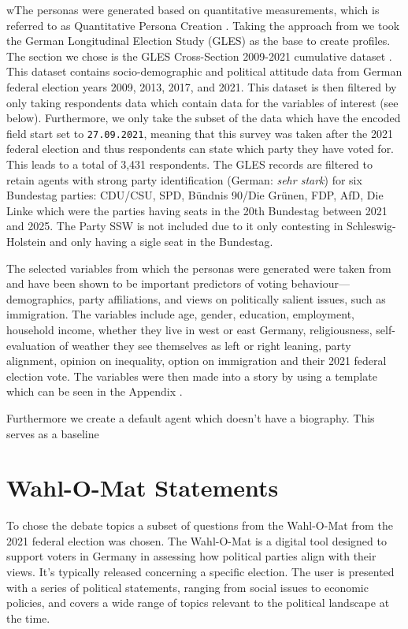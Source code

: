 wThe personas were generated based on quantitative measurements, which is referred to as Quantitative Persona Creation \cite{Salminen2020quantative}. Taking the approach from \cite{von2024vox} we took the German Longitudinal Election Study (GLES) as the base to create profiles. The section we chose is the GLES Cross-Section 2009-2021 cumulative dataset \citep{ZA6835}. This dataset contains socio-demographic and political attitude data from German federal election years 2009, 2013, 2017, and 2021. This dataset  is then filtered by only taking respondents data which contain data for the variables of interest (see below). Furthermore, we only take the subset of the data which have the encoded field start set to \texttt{27.09.2021}, meaning that this survey was taken after the 2021 federal election and thus respondents can state which party they have voted for. This leads to a total of 3,431 respondents. The GLES records are filtered to retain agents with strong party identification (German: \emph{sehr stark}) for six Bundestag parties: CDU/CSU, SPD, Bündnis 90/Die Grünen, FDP, AfD, Die Linke which were the parties having seats in the 20th Bundestag between 2021 and 2025. The Party SSW is not included due to it only contesting in Schleswig-Holstein and only having a sigle seat in the Bundestag. 

The selected variables from which the personas were generated were taken from \cite{von2024vox} and have been shown to be important predictors of voting behaviour—demographics, party affiliations, and views on politically salient issues, such as immigration. The variables include age, gender, education, employment, household income, whether they live in west or east Germany, religiousness, self-evaluation of weather they see themselves as left or right leaning, party alignment, opinion on inequality, option on immigration and their 2021 federal election vote. The variables were then made into a story by using a template which can be seen in the Appendix .

Furthermore we create a default agent which doesn't have a biography. This serves as a baseline 



\section{Wahl-O-Mat Statements}

To chose the debate topics a subset of questions from the Wahl-O-Mat from the 2021 federal election was chosen. The Wahl-O-Mat is a digital tool designed to support voters in Germany in assessing how political parties align with their views. It’s typically released concerning a specific election. The user is presented with a series of political statements, ranging from social issues to economic policies, and covers a wide range of topics relevant to the political landscape at the time.


